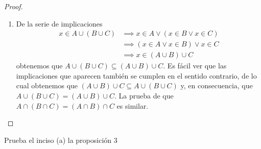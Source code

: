 \documentclass[12pt,a4paper]{article}
\begin{document}
    \begin{proof}
        \begin{enumerate}
            \item[(b)] De la serie de implicaciones
            \begin{align*}
                x\in A\cup(B\cup C)&\implies x\in A\lor(x\in B\lor x\in C)\\
                &\implies (x\in A\lor x\in B)\lor x\in C\\
                &\implies x\in(A\cup B)\cup C
            \end{align*}
            obtenemos que $A\cup(B\cup C)\subseteq (A\cup B)\cup C$. Es fácil ver que las implicaciones
            que aparecen también se cumplen en el sentido contrario, de lo cual obtenemos que $(A\cup B)\cup C\subseteq A\cup(B\cup C)$
            y, en consecuencia, que $A\cup(B\cup C)=(A\cup B)\cup C$. La prueba de que $A\cap(B\cap C)=(A\cap B)\cap C$
            es similar.
        \end{enumerate}
    \end{proof}

    \begin{problema}
        Prueba el inciso (a) la proposición 3
    \end{problema}
\end{document}
